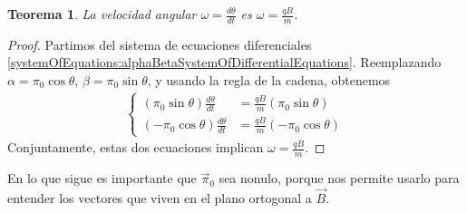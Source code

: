 \documentclass{article}
\newtheorem{theorem}{Teorema}
\begin{document}
  \begin{theorem}
    \label{theorem:thetaDifferentialEquation}
    La velocidad angular \(\omega = \frac{d \theta}{d t}\) es \(\omega = \frac{q B}{m}\).
  \end{theorem}
  \begin{proof}
    Partimos del sistema de ecuaciones diferenciales \eqref{systemOfEquations:alphaBetaSystemOfDifferentialEquations}.
    Reemplazando \(\alpha = \pi_0 \cos \theta\), \(\beta = \pi_0 \sin \theta\), y usando la regla de la cadena, obtenemos
    \begin{align}
      \left\{
        \begin{aligned}
          (\pi_0 \sin \theta) \frac{d \theta}{d t}
          &=
          \frac{q B}{m} (\pi_0 \sin \theta)
          \\
          (- \pi_0 \cos \theta) \frac{d \theta}{d t}
          &=
          \frac{q B}{m} (- \pi_0 \cos \theta)
        \end{aligned}
      \right.
    \end{align}
    Conjuntamente, estas dos ecuaciones implican \(\omega = \frac{q B}{m}\).
  \end{proof}

  En lo que sigue es importante que \(\vec{\pi}_0\) sea nonulo, porque nos permite usarlo para entender los vectores que viven en el plano ortogonal a \(\vec{B}\).
\end{document}
